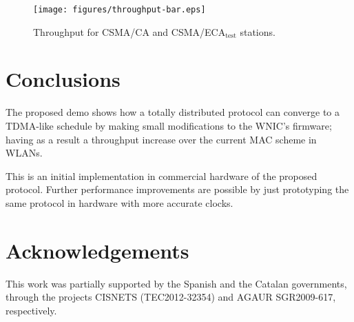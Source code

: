 \documentclass[conference]{IEEEtran}
\begin{document}
	
	\begin{figure}[htbp]
		\centering
		\texttt{[image: figures/throughput-bar.eps]}
		\caption{Throughput for CSMA/CA and CSMA/ECA$_{\text{test}}$ stations.}
		\label{fig:throughput}
	\end{figure}

\section{Conclusions}
The proposed demo shows how a totally distributed protocol can converge to a TDMA-like schedule by making small modifications to the WNIC's firmware; having as a result a throughput increase over the current MAC scheme in WLANs.

This is an initial implementation in commercial hardware of the proposed protocol. Further performance improvements are possible by just prototyping the same protocol in hardware with more accurate clocks.

\section{Acknowledgements}
This work was partially supported by the Spanish and the Catalan governments, through the projects CISNETS (TEC2012-32354) and AGAUR SGR2009-617, respectively.



\end{document}
